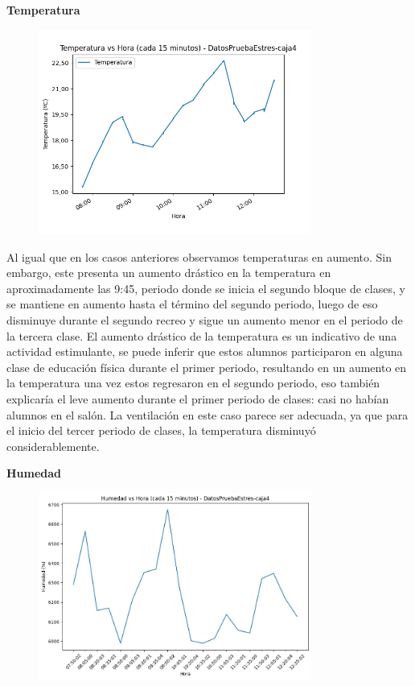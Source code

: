 \documentclass{templateNote}
\begin{document}
\newpage
\textbf{Temperatura}
\begin{figure}[H]
    \centering
    \includegraphics[width=0.8\textwidth]{img/DatosPruebaEstres-caja4_temperatura_vs_hora_15min.png}
\end{figure}

\begin{tcolorbox}
    Al igual que en los casos anteriores observamos temperaturas en aumento. Sin embargo, este presenta un aumento drástico en la temperatura en aproximadamente las 9:45, periodo donde se inicia el segundo bloque de clases, y se mantiene en aumento hasta el término del segundo periodo, luego de eso disminuye durante el segundo recreo y sigue un aumento menor en el periodo de la tercera clase. El aumento drástico de la temperatura es un indicativo de una actividad estimulante, se puede inferir que estos alumnos participaron en alguna clase de educación física durante el primer periodo, resultando en un aumento en la temperatura una vez estos regresaron en el segundo periodo, eso también explicaría el leve aumento durante el primer periodo de clases: casi no habían alumnos en el salón. La ventilación en este caso parece ser adecuada, ya que para el inicio del tercer periodo de clases, la temperatura disminuyó considerablemente.
\end{tcolorbox}

\newpage
\textbf{Humedad}
\begin{figure}[H]
    \centering
    \includegraphics[width=0.8\textwidth]{img/DatosPruebaEstres-caja4_humedad_vs_hora_15min.jpg}
\end{figure}
\end{document}
